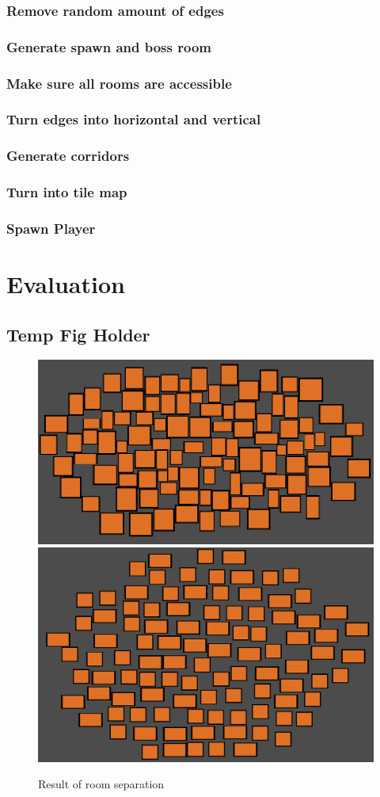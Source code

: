 \documentclass{article}
\begin{document}
\subsubsection{Remove random amount of edges}

\subsubsection{Generate spawn and boss room}

\subsubsection{Make sure all rooms are accessible}

\subsubsection{Turn edges into horizontal and vertical}

\subsubsection{Generate corridors}

\subsubsection{Turn into tile map}

\subsubsection{Spawn Player}

\section{Evaluation}

\pagebreak
\subsection{Temp Fig Holder}

\begin{figure}
\centering
\includegraphics[height = 0.2\textwidth]{rooms seperated}
\includegraphics[height = 0.2\textwidth]{spread rooms}
\caption{Result of room separation}
\label{room seperation result}
\end{figure}
\end{document}
